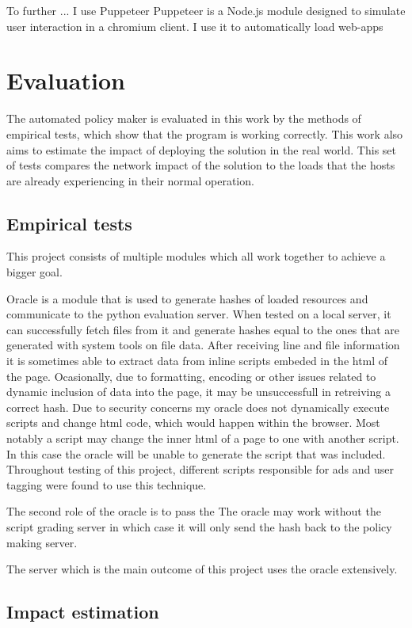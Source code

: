 To further ... I use Puppeteer
Puppeteer is a Node.js module designed to simulate user interaction in a chromium client.
I use it to automatically load web-apps 

\section{Evaluation}

The automated policy maker is evaluated in this work by the methods of empirical tests, which show that the program is working correctly.
This work also aims to estimate the impact of deploying the solution in the real world.
This set of tests compares the network impact of the solution to the loads that the hosts are already experiencing in their normal operation.

\subsection{Empirical tests}

This project consists of multiple modules which all work together to achieve a bigger goal.

Oracle is a module that is used to generate hashes of loaded resources and communicate to the python evaluation server.
When tested on a local server, it can successfully fetch files from it and generate hashes equal to the ones that are generated with system tools on file data.
After receiving line and file information it is sometimes able to extract data from inline scripts embeded in the html of the page.
Ocasionally, due to formatting, encoding or other issues related to dynamic inclusion of data into the page, it may be unsuccessfull in retreiving a correct hash.
Due to security concerns my oracle does not dynamically execute scripts and change html code, which would happen within the browser.
Most notably a script may change the inner html of a page to one with another script.
In this case the oracle will be unable to generate the script that was included.
Throughout testing of this project, different scripts responsible for ads and user tagging were found to use this technique.

The second role of the oracle is to pass the 
The oracle may work without the script grading server in which case it will only send the hash back to the policy making server.

The server which is the main outcome of this project uses the oracle extensively.

\subsection{Impact estimation}

